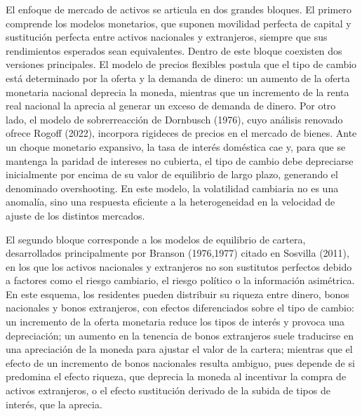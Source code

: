 ﻿\documentclass[11pt,a4paper]{article}
\newcommand{\todo}[1]{\textcolor{red}{[TODO: #1]}}
\begin{document}
El enfoque de mercado de activos se articula en dos grandes bloques. El primero comprende los modelos monetarios, que suponen movilidad perfecta de capital y sustitución perfecta entre activos nacionales y extranjeros, siempre que sus rendimientos esperados sean equivalentes. Dentro de este bloque coexisten dos versiones principales. El modelo de precios flexibles postula que el tipo de cambio está determinado por la oferta y la demanda de dinero: un aumento de la oferta monetaria nacional deprecia la moneda, mientras que un incremento de la renta real nacional la aprecia al generar un exceso de demanda de dinero. Por otro lado, el modelo de sobrerreacción de Dornbusch (1976), cuyo análisis renovado ofrece Rogoff (2022), incorpora rigideces de precios en el mercado de bienes. Ante un choque monetario expansivo, la tasa de interés doméstica cae y, para que se mantenga la paridad de intereses no cubierta, el tipo de cambio debe depreciarse inicialmente por encima de su valor de equilibrio de largo plazo, generando el denominado overshooting. En este modelo, la volatilidad cambiaria no es una anomalía, sino una respuesta eficiente a la heterogeneidad en la velocidad de ajuste de los distintos mercados.

El segundo bloque corresponde a los modelos de equilibrio de cartera, desarrollados principalmente por Branson (1976,1977) citado en Sosvilla (2011), en los que los activos nacionales y extranjeros no son sustitutos perfectos debido a factores como el riesgo cambiario, el riesgo político o la información asimétrica. En este esquema, los residentes pueden distribuir su riqueza entre dinero, bonos nacionales y bonos extranjeros, con efectos diferenciados sobre el tipo de cambio: un incremento de la oferta monetaria reduce los tipos de interés y provoca una depreciación; un aumento en la tenencia de bonos extranjeros suele traducirse en una apreciación de la moneda para ajustar el valor de la cartera; mientras que el efecto de un incremento de bonos nacionales resulta ambiguo, pues depende de si predomina el efecto riqueza, que deprecia la moneda al incentivar la compra de activos extranjeros, o el efecto sustitución derivado de la subida de tipos de interés, que la aprecia.

\end{document}

